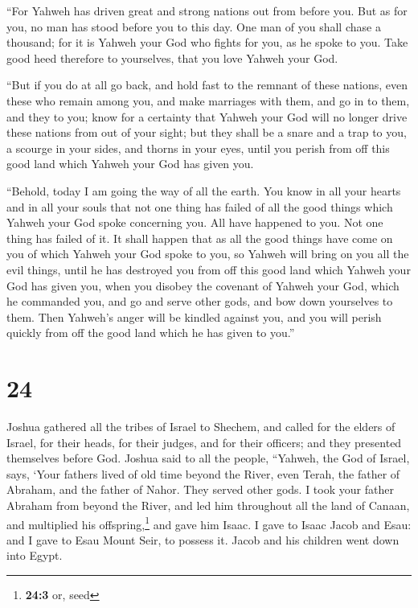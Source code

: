  ``For Yahweh has driven great and strong nations out from
before you. But as for you, no man has stood before you to this day.
 One man of you shall chase a thousand; for it is Yahweh
your God who fights for you, as he spoke to you.  Take
good heed therefore to yourselves, that you love Yahweh your God.

 ``But if you do at all go back, and hold fast to the
remnant of these nations, even these who remain among you, and make
marriages with them, and go in to them, and they to you; 
know for a certainty that Yahweh your God will no longer drive these
nations from out of your sight; but they shall be a snare and a trap to
you, a scourge in your sides, and thorns in your eyes, until you perish
from off this good land which Yahweh your God has given you.

 ``Behold, today I am going the way of all the earth. You
know in all your hearts and in all your souls that not one thing has
failed of all the good things which Yahweh your God spoke concerning
you. All have happened to you. Not one thing has failed of it.
 It shall happen that as all the good things have come on
you of which Yahweh your God spoke to you, so Yahweh will bring on you
all the evil things, until he has destroyed you from off this good land
which Yahweh your God has given you,  when you disobey
the covenant of Yahweh your God, which he commanded you, and go and
serve other gods, and bow down yourselves to them. Then Yahweh's anger
will be kindled against you, and you will perish quickly from off the
good land which he has given to you.''

\hypertarget{section-23}{%
\section{24}\label{section-23}}

 Joshua gathered all the tribes of Israel to Shechem, and
called for the elders of Israel, for their heads, for their judges, and
for their officers; and they presented themselves before God.
 Joshua said to all the people, ``Yahweh, the God of
Israel, says, `Your fathers lived of old time beyond the River, even
Terah, the father of Abraham, and the father of Nahor. They served other
gods.  I took your father Abraham from beyond the River,
and led him throughout all the land of Canaan, and multiplied his
offspring,\footnote{\textbf{24:3} or, seed} and gave him Isaac.
 I gave to Isaac Jacob and Esau: and I gave to Esau Mount
Seir, to possess it. Jacob and his children went down into Egypt.

